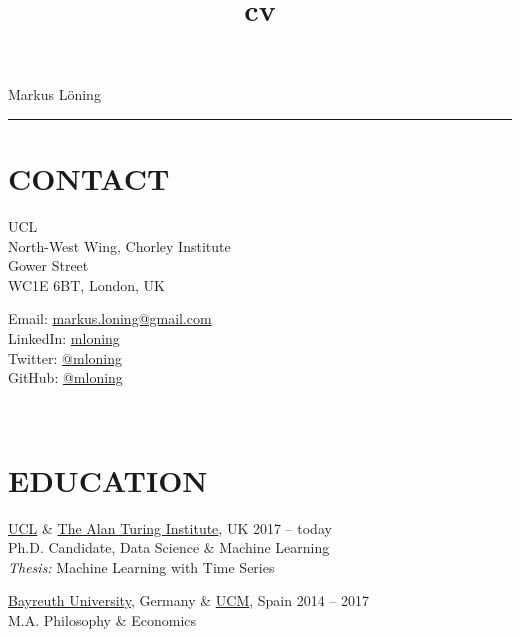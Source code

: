\documentclass{cv}
\title{cv}
\begin{document}
{\LARGE Markus Löning}
\vspace{12pt}
\hrule

\section{CONTACT}

\begin{minipage}{.44\textwidth}
\vspace{3pt}
{\raggedright{} UCL \\
North-West Wing, Chorley Institute \\
Gower Street \\
WC1E 6BT, London, UK}
\end{minipage}
\hspace{1.25cm}
\begin{minipage}{.44\textwidth}
\vspace{3pt}
Email: \href{mailto:markus.loning@gmail.com}{markus.loning@gmail.com} \\
LinkedIn: \href{https://linkedin.com/in/mloning}{mloning} \\
Twitter: \href{https://twitter.com/mloning_}{@mloning\textunderscore} \\
GitHub: \href{https://github.com/mloning}{@mloning}
\end{minipage}
\\

\section{EDUCATION}

\href{https://www.ucl.ac.uk/}{UCL} \& \href{https://www.turing.ac.uk/}{The Alan Turing Institute}, UK \hfill 2017 -- today \\
Ph.D. Candidate, Data Science \& Machine Learning \\
{\color{lightgray} \emph{Thesis:} Machine Learning with Time Series} %
\vspace{15pt}

\href{https://www.uni-bayreuth.de/en/}{Bayreuth University}, Germany \& \href{https://www.ucm.es/english}{UCM}, Spain \hfill 2014 -- 2017 \\
M.A. Philosophy \& Economics 
\vspace{15pt}
\end{document}
